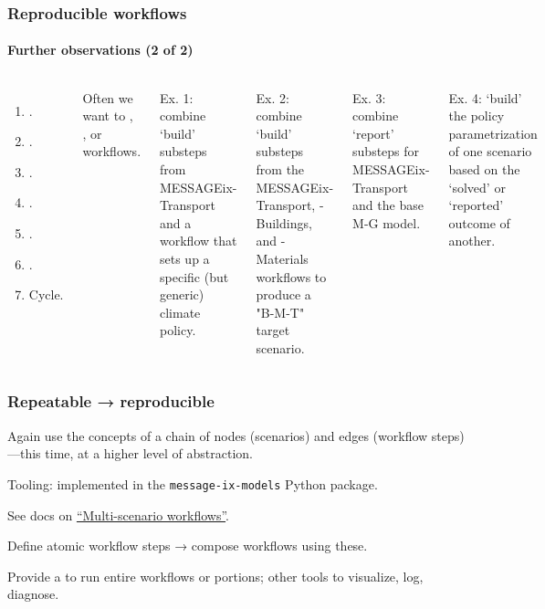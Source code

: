 \documentclass[12pt,aspectratio=169]{beamer}
\begin{document}
\begin{frame}
\frametitle{Reproducible workflows}
\framesubtitle{Further observations (2 of 2)}

\begin{columns}[T]
\begin{enumerate}
  \item {}.
  \item {}.
  \item {}.
  \item {}.
  \item {}.
  \item {}.
  \item Cycle.
\end{enumerate}

Often we want to , , or  workflows.

\smallskip
Ex. 1: combine ‘build’ substeps from MESSAGEix-Transport and a workflow that sets up a specific (but generic) climate policy.

\smallskip
Ex. 2: combine ‘build’ substeps from the MESSAGEix-Transport, -Buildings, and -Materials workflows to produce a "B-M-T" target scenario.

\smallskip
Ex. 3: combine ‘report’ substeps for MESSAGEix-Transport and the base M-G model.

\smallskip
Ex. 4: ‘build’ the policy parametrization of one scenario based on the ‘solved’ or ‘reported’ outcome of another.
\end{columns}
\end{frame}

\begin{frame}
\frametitle{Repeatable → reproducible}

Again use the concepts of a chain of nodes (scenarios) and edges (workflow steps)—this time, at a higher level of abstraction.

\bigskip
Tooling: implemented in the \texttt{message-ix-models} Python package.

See docs on \href{https://docs.messageix.org/projects/models/en/latest/api/workflow.html}{“Multi-scenario workflows”}.

\bigskip
Define atomic workflow steps → compose workflows using these.

\bigskip
Provide a  to run entire workflows or portions; other tools to visualize, log, diagnose.
\end{frame}
\end{document}
